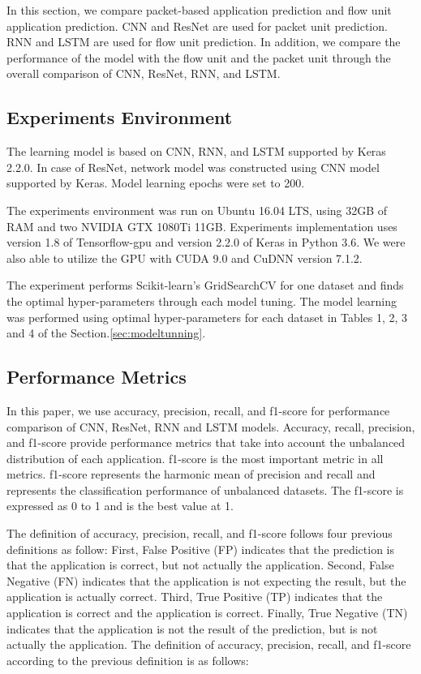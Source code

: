 In this section, we compare packet-based application prediction and flow unit application prediction.
CNN and ResNet are used for packet unit prediction.
RNN and LSTM are used for flow unit prediction.
In addition, we compare the performance of the model with the flow unit and the packet unit through the overall comparison of CNN, ResNet, RNN, and LSTM.

\subsection{Experiments Environment}
The learning model is based on CNN, RNN, and LSTM supported by Keras 2.2.0.
In case of ResNet, network model was constructed using CNN model supported by Keras.
Model learning epochs were set to 200.

The experiments environment was run on Ubuntu 16.04 LTS, using 32GB of RAM and two NVIDIA GTX 1080Ti 11GB.
Experiments implementation uses version 1.8 of Tensorflow-gpu and version 2.2.0 of Keras in Python 3.6.
We were also able to utilize the GPU with CUDA 9.0 and CuDNN version 7.1.2.

The experiment performs Scikit-learn's GridSearchCV for one dataset and finds the optimal hyper-parameters through each model tuning.
The model learning was performed using optimal hyper-parameters for each dataset in Tables 1, 2, 3 and 4 of the Section.\ref{sec:modeltunning}.

\subsection{Performance Metrics}
In this paper, we use accuracy, precision, recall, and f1-score for performance comparison of CNN, ResNet, RNN and LSTM models.
Accuracy, recall, precision, and f1-score provide performance metrics that take into account the unbalanced distribution of each application.
f1-score is the most important metric in all metrics.
f1-score represents the harmonic mean of precision and recall and represents the classification performance of unbalanced datasets.
The f1-score is expressed as 0 to 1 and is the best value at 1.

The definition of accuracy, precision, recall, and f1-score follows four previous definitions as follow:
First, False Positive (FP) indicates that the prediction is that the application is correct, but not actually the application.
Second, False Negative (FN) indicates that the application is not expecting the result, but the application is actually correct.
Third, True Positive (TP) indicates that the application is correct and the application is correct.
Finally, True Negative (TN) indicates that the application is not the result of the prediction, but is not actually the application.
The definition of accuracy, precision, recall, and f1-score according to the previous definition is as follows:

